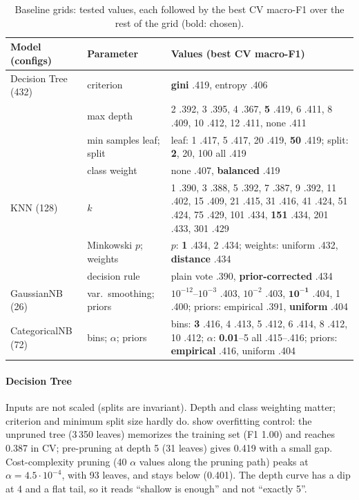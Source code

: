 \begin{table}[t]
\centering
\caption{Baseline grids: tested values, each followed by the best CV macro-F1 over the rest of the grid (bold: chosen).}\label{tab:grids}
{\tabfont\setlength{\tabcolsep}{4pt}
\begin{tabular}{@{}l l p{}@{}}
\toprule
Model (configs) & Parameter & Values (best CV macro-F1)\\
\midrule
Decision Tree (432) & criterion & \textbf{gini} .419, entropy .406\\
 & max depth & 2 .392, 3 .395, 4 .367, \textbf{5} .419, 6 .411, 8 .409, 10 .412, 12 .411, none .411\\
 & min samples leaf; split & leaf: 1 .417, 5 .417, 20 .419, \textbf{50} .419; split: \textbf{2}, 20, 100 all .419\\
 & class weight & none .407, \textbf{balanced} .419\\
\midrule
KNN (128) & $k$ & 1 .390, 3 .388, 5 .392, 7 .387, 9 .392, 11 .402, 15 .409, 21 .415, 31 .416, 41 .424, 51 .424, 75 .429, 101 .434, \textbf{151} .434, 201 .433, 301 .429\\
 & Minkowski $p$; weights & $p$: \textbf{1} .434, 2 .434; weights: uniform .432, \textbf{distance} .434\\
 & decision rule & plain vote .390, \textbf{prior-corrected} .434\\
\midrule
GaussianNB (26) & var.\ smoothing; priors & $10^{-12}$--$10^{-3}$ .403, $10^{-2}$ .403, $\mathbf{10^{-1}}$ .404, 1 .400; priors: empirical .391, \textbf{uniform} .404\\
CategoricalNB (72) & bins; $\alpha$; priors & bins: \textbf{3} .416, 4 .413, 5 .412, 6 .414, 8 .412, 10 .412; $\alpha$: \textbf{0.01}--5 all .415--.416; priors: \textbf{empirical} .416, uniform .404\\
\bottomrule
\end{tabular}}
\end{table}

\paragraph{Decision Tree} Inputs are not scaled (splits are invariant). Depth and class weighting matter; criterion and minimum split size hardly do.  show overfitting control: the unpruned tree (3\,350 leaves) memorizes the training set (F1 1.00) and reaches 0.387 in CV; pre-pruning at depth 5 (31 leaves) gives 0.419 with a small gap. Cost-complexity pruning (40 $\alpha$ values along the pruning path) peaks at $\alpha=4.5\cdot10^{-4}$, with 93 leaves, and stays below (0.401). The depth curve has a dip at 4 and a flat tail, so it reads ``shallow is enough'' and not ``exactly 5''.

